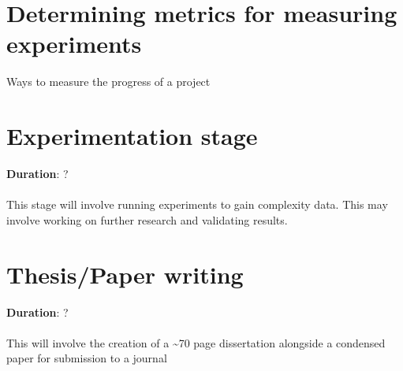 \section{Determining metrics for measuring experiments}

Ways to measure the progress of a project

\section{Experimentation stage}

\textbf{Duration}: ?
\\\\
This stage will involve running experiments to gain complexity data. This may involve working on further research and validating results.

\section{Thesis/Paper writing}

\textbf{Duration}: ?
\\\\
This will involve the creation of a \textasciitilde70 page dissertation alongside a condensed paper for submission to a journal
